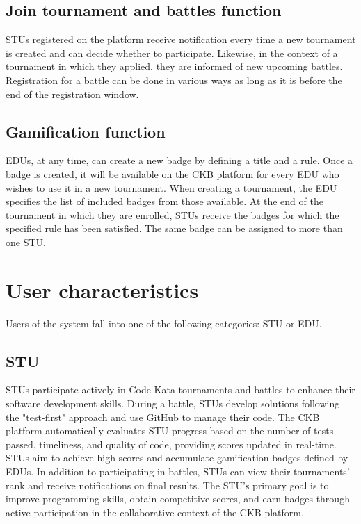 \subsection{Join tournament and battles function}
STUs registered on the platform receive notification every time a new tournament is created and can decide whether to participate.
Likewise, in the context of a tournament in which they applied, they are informed of new upcoming battles.
Registration for a battle can be done in various ways as long as it is before the end of the registration window.

\subsection{Gamification function}
EDUs, at any time, can create a new badge by defining a title and a rule.
Once a badge is created, it will be available on the CKB platform for every EDU who wishes to use it in a new tournament.
When creating a tournament, the EDU specifies the list of included badges from those available.
At the end of the tournament in which they are enrolled, STUs receive the badges for which the specified rule has been satisfied.
The same badge can be assigned to more than one STU.

\section{User characteristics}
Users of the system fall into one of the following categories: STU or EDU.

\subsection*{STU}
STUs participate actively in Code Kata tournaments and battles to enhance their software development skills.
During a battle, STUs develop solutions following the "test-first" approach and use GitHub to manage their code.
The CKB platform automatically evaluates STU progress based on the number of tests passed, timeliness, and quality of code, providing scores updated in real-time.
STUs aim to achieve high scores and accumulate gamification badges defined by EDUs.
In addition to participating in battles, STUs can view their tournaments' rank and receive notifications on final results.
The STU's primary goal is to improve programming skills, obtain competitive scores, and earn badges through active participation in the collaborative context of the CKB platform.

